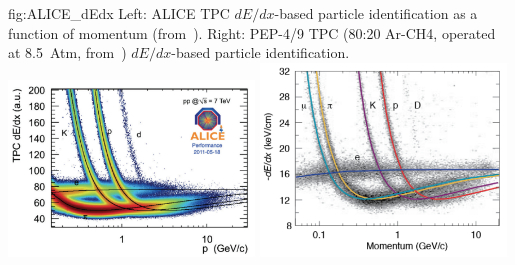 \begin{dunefigure}{fig:ALICE_dEdx}
{Left: ALICE TPC $dE/dx$-based particle identification as a function of momentum (from~\cite{ALICE_Lippmann}). Right: PEP-4/9 TPC (80:20 Ar-CH4, operated at 8.5~Atm, from~\cite{Grupen:1999by}) $dE/dx$-based particle identification.}
\includegraphics[width=0.49\textwidth]{graphics/ALICE_TPC_dEdx_Lippmann_2012.png}
\includegraphics[width=0.49\textwidth]{graphics/PEP4-TPC-80Ar-20CH4-8_5atm_dEdx.png} 
\end{dunefigure}

